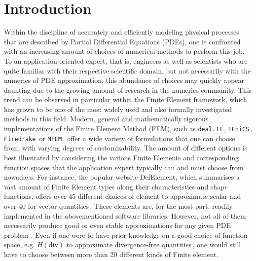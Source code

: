 \documentclass[asi,article,submit,moreauthors]{Definitions/mdpi}
\begin{document}



\section{Introduction}\label{sec:introduction}

Within the discipline of accurately and efficiently modeling physical processes that are described by Partial Differential Equations (PDEs), one is confronted with an increasing amount of choices of numerical methods to perform this job.
To an application-oriented expert, that is, engineers as well as scientists who are quite familiar with their respective scientific domain, but not necessarily with the numerics of PDE approximation, this abundance of choices may quickly appear daunting due to the growing amount of research in the numerics community.
This trend can be observed in particular within the Finite Element framework, which has grown to be one of the most widely used and also formally investigated methods in this field.
Modern, general and mathematically rigorous implementations of the Finite Element Method (FEM), such as \texttt{deal.II}\,\cite{bangerthDealIIGeneralpurpose2007}, \texttt{FEniCS}\,\cite{AlnaesEtal2015}, \texttt{Firedrake}\,\cite{FiredrakeUserManual} or \texttt{MFEM}\,\cite{andersonMFEMModularFinite2021a}, offer a wide variety of formulations that one can choose from, with varying degrees of customizability.
The amount of different options is best illustrated by considering the various Finite Elements and corresponding function spaces that the application expert typically can and must choose from nowadays.
For instance, the popular website DefElement, which summarises a vast amount of Finite Element types along their characteristics and shape functions, offers over 45 different choices of element to approximate scalar and over 40 for vector quantities\,\cite{scroggsDefElementEncyclopediaFinite2023}.
These elements are, for the most part, readily implemented in the abovementioned software libraries.
However, not all of them necessarily produce good or even stable approximations for any given PDE problem \cite{brezziDiscourseStabilityConditions1990}.
Even if one were to have prior knowledge on a good choice of function space, e.g. $H(\textrm{div})$ to approximate divergence-free quantities\,\cite{johnDivergenceConstraintMixed2017}, one would still have to choose between more than 20 different kinds of Finite element.
\end{document}
